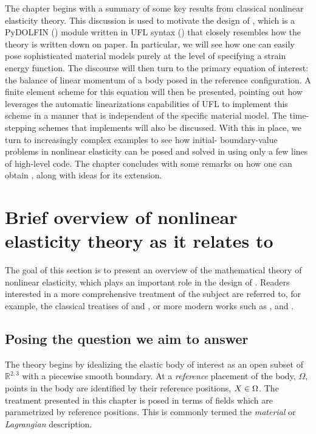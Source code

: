 The chapter begins with a summary of some key results from classical
nonlinear elasticity theory. This discussion is used to motivate the
design of \twist, which is a PyDOLFIN (\cite{LoggWells2010}) module
written in UFL syntax (\cite{AlnaesA.Logg2009}) that closely resembles
how the theory is written down on paper. In particular, we will see
how one can easily pose sophisticated material models purely at the
level of specifying a strain energy function. The discourse will then
turn to the primary equation of interest: the balance of linear
momentum of a body posed in the reference configuration. A finite
element scheme for this equation will then be presented, pointing out
how \twist{} leverages the automatic linearizations capabilities of UFL
to implement this scheme in a manner that is independent of the
specific material model. The time-stepping schemes that \twist{}
implements will also be discussed. With this in place, we turn to
increasingly complex examples to see how initial- boundary-value
problems in nonlinear elasticity can be posed and solved in \twist{}
using only a few lines of high-level code. The chapter concludes with
some remarks on how one can obtain \twist, along with ideas for its
extension.

\section{Brief overview of nonlinear elasticity theory as it relates
  to \twist}

The goal of this section is to present an overview of the mathematical
theory of nonlinear elasticity, which plays an important role in the
design of \twist. Readers interested in a more comprehensive treatment
of the subject are referred to, for example, the classical treatises
of \cite{TruesdellToupin1960} and \cite{TruesdellNoll1965}, or more
modern works such as \cite{Gurtin1981}, \cite{Ogden1997} and
\cite{Holzapfel2000}.

\subsection{Posing the question we aim to answer}

The theory begins by idealizing the elastic body of interest as an
open subset of $\mathbb{R}^{2, 3}$ with a piecewise smooth
boundary. At a {\em reference} placement of the body, $\Omega$, points
in the body are identified by their reference positions, $\mbox{$ X$} \in
\Omega$. The treatment presented in this chapter is posed in terms of
fields which are parametrized by reference positions. This is commonly
termed the {\em material} or {\em Lagrangian} description.


